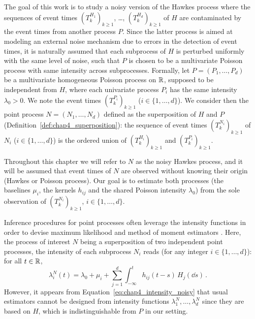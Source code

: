         The goal of this work is to study a noisy version of the Hawkes process where the sequences of event times $(T_k^{H_1})_{k\ge1}$, \dots, $(T_k^{H_d})_{k\ge1}$ of $H$ are contaminated by the event times from another process $P$.
        Since the latter process is aimed at modeling an external noise mechanism due to errors in the detection of event times,
        it is naturally assumed that each subprocess of $H$ is perturbed uniformly with the same level of noise,
        such that $P$ is chosen to be a multivariate Poisson process with same intensity across subprocesses.
        Formally, let $P = (P_1, \ldots, P_d)$ be a multivariate homogeneous Poisson process on ${\mathbb R}$, supposed to be independent from $H$, where each univariate process $P_i$ has the same intensity $\lambda_0 > 0$.
        We note the event times $(T_k^{P_i})_{k\ge1}$ ($i \in \{1, \dots, d\}$).        
        We consider then the point process $N = (N_1, \ldots, N_d)$ defined as the superposition of $H$ and $P$ (Definition~\ref{def:chap4_superposition}):
        the sequence of event times $(T_k^{N_i})_{k\ge1}$ of $N_i$ ($i \in \{1, \dots, d\}$) is the ordered union of $(T_k^{H_i})_{k\ge1}$ and $(T_k^{P_i})_{k\ge1}$.
        
        Throughout this chapter we will refer to $N$ as the noisy Hawkes process,
        and it will be assumed that event times of $N$ are observed without knowing their origin (Hawkes or Poisson process).
        Our goal is to estimate both processes (\ie the baselines $\mu_i$, the kernels $h_{ij}$ and the shared Poisson intensity $\lambda_0$) from the sole observation of $(T_k^{N_i})_{k\geq1}$, $i \in \{1, \dots, d\}$.
        
        Inference procedures for point processes often leverage the intensity functions in order to devise maximum likelihood and method of moment estimators \parencite{Ogata1988, Ozaki1979, DaFonseca2013}.
        Here, the process of interest $N$ being a superposition of two independent point processes,
        the intensity of each subprocess $N_i$ reads (for any integer $i \in \{1, \dots, d\}$):
        for all $t \in {\mathbb R}$,
        \begin{equation}
          \lambda_i^N(t) = \lambda_0 + \mu_i + \sum_{j=1}^{d}\int_{-\infty}^{t}{h_{ij}(t-s) \, H_j(\dd s)}\,.
          \label{eq:chap4_intensity_noisy}
        \end{equation}
        However, it appears from Equation~\eqref{eq:chap4_intensity_noisy} that usual estimators cannot be designed from intensity functions $\lambda_1^N, \dots, \lambda_d^N$ since they are based on $H$, 
        which is indistinguishable from $P$ in our setting.
        
